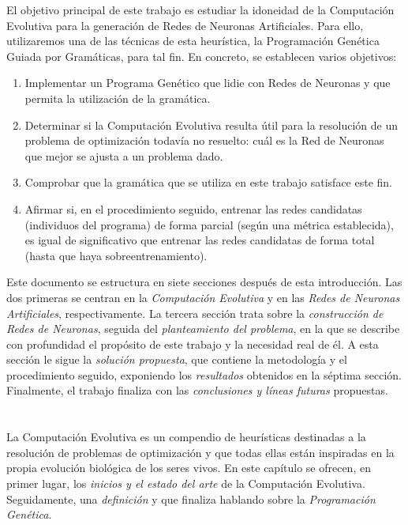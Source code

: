 \documentclass[spanish,a4paper,12pt,twoside]{report}
\begin{document}
  El objetivo principal de este trabajo es estudiar la idoneidad de la Computación Evolutiva para la generación de Redes de Neuronas Artificiales. Para ello, utilizaremos una de las técnicas de esta heurística, la Programación Genética Guiada por Gramáticas, para tal fin. En concreto, se establecen varios objetivos:
  \begin{enumerate}
    \item Implementar un Programa Genético que lidie con Redes de Neuronas y que permita la utilización de la gramática.
    \item Determinar si la Computación Evolutiva resulta útil para la resolución de un problema de optimización todavía no resuelto: cuál es la Red de Neuronas que mejor se ajusta a un problema dado.
    \item Comprobar que la gramática que se utiliza en este trabajo satisface este fin.
    \item Afirmar si, en el procedimiento seguido, entrenar las redes candidatas (individuos del programa) de forma parcial (según una métrica establecida), es igual de significativo que entrenar las redes candidatas de forma total (hasta que haya sobreentrenamiento).
  \end{enumerate} \par
  Este documento se estructura en siete secciones después de esta introducción. Las dos primeras se centran en la \emph{Computación Evolutiva} y en las \emph{Redes de Neuronas Artificiales}, respectivamente. La tercera sección trata sobre la \emph{construcción de Redes de Neuronas}, seguida del \emph{planteamiento del problema}, en la que se describe con profundidad el propósito de este trabajo y la necesidad real de él. A esta sección le sigue la \emph{solución propuesta}, que contiene la metodología y el procedimiento seguido, exponiendo los \emph{resultados} obtenidos en la séptima sección. Finalmente, el trabajo finaliza con las \emph{conclusiones y líneas futuras} propuestas. \par
  
  \chapter{\vspace{-3cm}{\LARGE 2. Computación Evolutiva}}
  \vspace{-1cm}
  La Computación Evolutiva es un compendio de heurísticas destinadas a la resolución de problemas de optimización y que todas ellas están inspiradas en la propia evolución biológica de los seres vivos. En este capítulo se ofrecen, en primer lugar, los \emph{inicios y el estado del arte} de la Computación Evolutiva. Seguidamente, una \emph{definición} y que finaliza hablando sobre la \emph{Programación Genética}.
\end{document}
